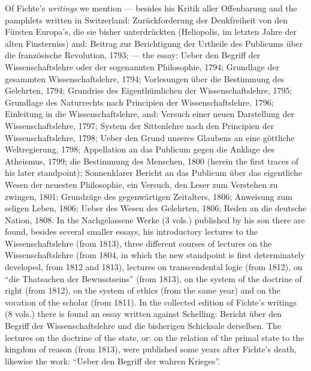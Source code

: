 Of Fichte's \emph{writings} we mention --- besides his Kritik aller
Offenbarung and the pamphlets written in Switzerland: Zurückforderung
der Denkfreiheit von den Fürsten Europa's, die sie bisher unterdrückten
(Heliopolis, im letzten Jahre der alten Finsterniss) and: Beitrag zur
Berichtigung der Urtheile des Publicums über die französische
Revolution, 1793; --- the essay: Ueber den Begriff der
Wissenschaftslehre oder der sogenannten Philosophie, 1794; Grundlage
der gesammten Wissenschaftslehre, 1794; Vorlesungen über die Bestimmung
des Gelehrten, 1794; Grundriss des Eigenthümlichen der
Wissenschaftslehre, 1795; Grundlage des Naturrechts nach Principien der
Wissenschaftslehre, 1796; Einleitung in die Wissenschaftslehre, and:
Versuch einer neuen Darstellung der Wissenschaftslehre, 1797; System
der Sittenlehre nach den Principien der Wissenschaftslehre,
1798; Ueber den Grund unseres Glaubens an eine göttliche
Weltregierung, 1798; Appellation an das Publicum gegen die Anklage des
Atheismus, 1799; die Bestimmung des Menschen, 1800 (herein the first
traces of his later standpoint); Sonnenklarer Bericht an das Publicum
über das eigentliche Wesen der neuesten Philosophie, ein Versuch, den
Leser zum Verstehen zu zwingen, 1801; Grundzüge des gegenwärtigen
Zeitalters, 1806; Anweisung zum seligen Leben, 1806; Ueber des Wesen
des Gelehrten, 1806; Reden an die deutsche Nation, 1808. In the
Nachgelassene Werke (3 vols.) published by his son there are found,
besides several smaller essays, his introductory lectures to the
Wissenschaftslehre (from 1813), three different courses of lectures on
the Wissenschaftslehre (from 1804, in which the new standpoint is first
determinately developed, from 1812 and 1813), lectures on transcendental
logic (from 1812), on ``die Thatsachen der Bewusstseins'' (from 1813),
on the system of the doctrine of right (from 1812), on the system of
ethics (from the same year) and on the vocation of the scholar (from
1811). In the collected edition of Fichte's writings (8 vols.) there is
found an essay written against Schelling: Bericht über den Begriff der
Wissenschaftslehre und die bisherigen Schicksale derselben. The
lectures on the doctrine of the state, or: on the relation of the
primal state to the kingdom of reason (from 1813), were published some
years after Fichte's death, likewise the work: ``Ueber den Begriff der
wahren Krieges''.

\divrule

